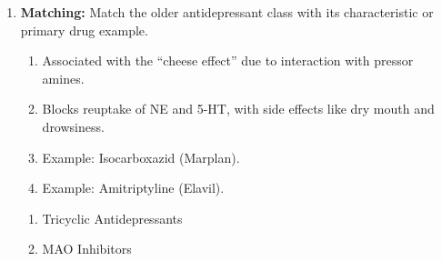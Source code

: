 \begin{enumerate}[label=\textbf{Q4.2.\arabic*}]



    \item \textbf{Matching:} Match the older antidepressant class with its characteristic or primary drug example.
    \begin{wordbox}
        \begin{enumerate}[label=(\Alph*)]
            \item Associated with the ``cheese effect'' due to interaction with pressor amines.
            \item Blocks reuptake of NE and 5-HT, with side effects like dry mouth and drowsiness.
            \item Example: Isocarboxazid (Marplan).
            \item Example: Amitriptyline (Elavil).
        \end{enumerate}
    \end{wordbox}
    \begin{enumerate}[label=(\alph*)]
        \item Tricyclic Antidepressants \quad \dotfill \quad \underline{\hspace{3cm}}\\[0.5em]
        \item MAO Inhibitors \quad \dotfill \quad \underline{\hspace{3cm}}
    \end{enumerate}


\end{enumerate}
